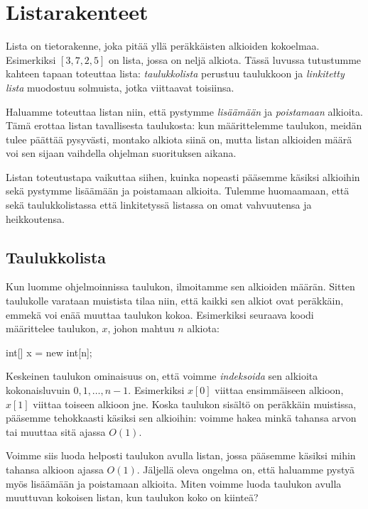 \chapter{Listarakenteet}

Lista on tietorakenne, joka pitää yllä
peräkkäisten alkioiden kokoelmaa.
Esimerkiksi $[3,7,2,5]$ on lista, jossa on neljä alkiota.
Tässä luvussa tutustumme kahteen tapaan toteuttaa lista:
\emph{taulukkolista} perustuu taulukkoon ja \emph{linkitetty lista}
muodostuu solmuista, jotka viittaavat toisiinsa.

Haluamme toteuttaa listan niin, että pystymme \emph{lisäämään} ja
\emph{poistamaan} alkioita.
Tämä erottaa listan tavallisesta taulukosta:
kun määrittelemme taulukon, meidän tulee päättää pysyvästi,
montako alkiota siinä on,
mutta listan alkioiden määrä voi sen sijaan vaihdella
ohjelman suorituksen aikana.

Listan toteutustapa vaikuttaa siihen, kuinka nopeasti
pääsemme käsiksi alkioihin sekä pystymme lisäämään
ja poistamaan alkioita.
Tulemme huomaamaan, että sekä taulukkolistassa että
linkitetyssä listassa on omat vahvuutensa ja heikkoutensa.

\section{Taulukkolista}

Kun luomme ohjelmoinnissa taulukon,
ilmoitamme sen alkioiden määrän.
Sitten taulukolle varataan muistista tilaa niin,
että kaikki sen alkiot ovat peräkkäin,
emmekä voi enää muuttaa taulukon kokoa.
Esimerkiksi seuraava koodi määrittelee taulukon,
$x$, johon mahtuu $n$ alkiota:

\begin{code}
int[] x = new int[n];
\end{code}

Keskeinen taulukon ominaisuus on,
että voimme \emph{indeksoida} sen alkioita
kokonaisluvuin $0,1,\dots,n-1$.
Esimerkiksi $x[0]$ viittaa ensimmäiseen alkioon,
$x[1]$ viittaa toiseen alkioon jne.
Koska taulukon sisältö on peräkkäin muistissa,
pääsemme tehokkaasti käsiksi sen alkioihin:
voimme hakea minkä tahansa arvon
tai muuttaa sitä ajassa $O(1)$.

Voimme siis luoda helposti taulukon avulla listan,
jossa pääsemme käsiksi mihin tahansa alkioon ajassa $O(1)$.
Jäljellä oleva ongelma on, että haluamme pystyä myös
lisäämään ja poistamaan alkioita.
Miten voimme luoda taulukon avulla muuttuvan kokoisen listan,
kun taulukon koko on kiinteä?

